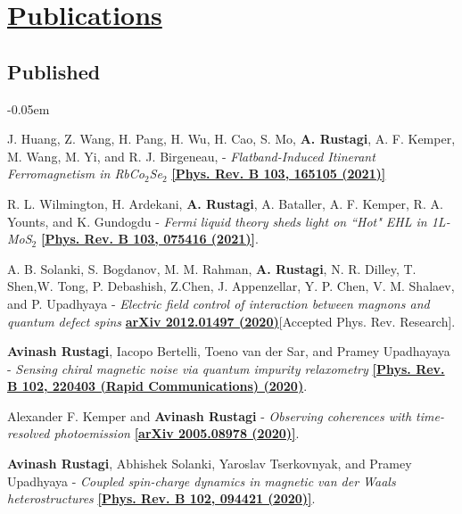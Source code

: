 \documentclass[12pt]{article}
\begin{document}
\section*{\underline{Publications}}
\subsection*{Published}
\begin{etaremune}
\itemsep-0.05em

\item J. Huang, Z. Wang, H. Pang, H. Wu, H. Cao, S. Mo, {\bf A. Rustagi}, A. F. Kemper, M. Wang, M. Yi, and R. J. Birgeneau,  - \textit{Flatband-Induced Itinerant Ferromagnetism in RbCo$_2$Se$_2$} \href{https://doi.org/10.1103/PhysRevB.103.165105}{\bf [Phys. Rev. B 103, 165105 (2021)]}

\item R. L. Wilmington, H. Ardekani, {\bf A. Rustagi}, A. Bataller, A. F. Kemper, R. A. Younts, and K. Gundogdu - \textit{Fermi liquid theory sheds light on ``Hot" EHL in 1L-MoS$_2$} \href{https://doi.org/10.1103/PhysRevB.103.075416}{\bf [Phys. Rev. B 103, 075416 (2021)]}.

\item A. B. Solanki, S. Bogdanov, M. M. Rahman, {\bf A. Rustagi}, N. R. Dilley, T. Shen,W. Tong, P. Debashish, Z.Chen, J. Appenzellar, Y. P. Chen, V. M. Shalaev, and P. Upadhyaya - \textit{Electric field control of interaction between magnons and quantum defect spins} \href{https://arxiv.org/abs/2012.01497}{\bf arXiv 2012.01497 (2020)}[Accepted Phys. Rev. Research].

\item {\bf Avinash Rustagi}, Iacopo Bertelli, Toeno van der Sar, and Pramey Upadhayaya - \textit{Sensing chiral magnetic noise via quantum impurity relaxometry} \href{https://link.aps.org/doi/10.1103/PhysRevB.102.220403}{\bf [Phys. Rev. B 102, 220403 (Rapid Communications) (2020)}.

\item Alexander F. Kemper and {\bf Avinash Rustagi} - \textit{Observing coherences with time-resolved photoemission} \href{https://arxiv.org/abs/2005.08978}{\bf [arXiv 2005.08978 (2020)]}.

\item {\bf Avinash Rustagi}, Abhishek Solanki, Yaroslav Tserkovnyak, and Pramey Upadhyaya - \textit{Coupled spin-charge dynamics in magnetic van der Waals heterostructures} \href{https://link.aps.org/doi/10.1103/PhysRevB.102.094421}{\bf [Phys. Rev. B 102, 094421 (2020)]}.


\end{etaremune}
\end{document}
